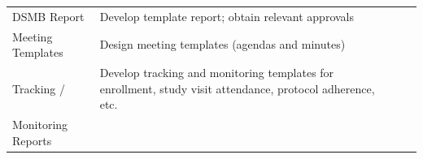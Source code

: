 \documentclass[]{book}
\begin{document}
\begin{longtable}[]{@{}llll@{}}
\begin{minipage}[t]{0.08\columnwidth}\raggedright\strut
DSMB Report\strut
\end{minipage} & \begin{minipage}[t]{0.28\columnwidth}\raggedright\strut
Develop template report; obtain relevant approvals\strut
\end{minipage} & \begin{minipage}[t]{0.35\columnwidth}\raggedright\strut
\strut
\end{minipage} & \begin{minipage}[t]{0.17\columnwidth}\raggedright\strut
\strut
\end{minipage}\tabularnewline
\begin{minipage}[t]{0.08\columnwidth}\raggedright\strut
Meeting Templates\strut
\end{minipage} & \begin{minipage}[t]{0.28\columnwidth}\raggedright\strut
Design meeting templates (agendas and minutes)\strut
\end{minipage} & \begin{minipage}[t]{0.35\columnwidth}\raggedright\strut
\strut
\end{minipage} & \begin{minipage}[t]{0.17\columnwidth}\raggedright\strut
\strut
\end{minipage}\tabularnewline
\begin{minipage}[t]{0.08\columnwidth}\raggedright\strut
Tracking /\strut
\end{minipage} & \begin{minipage}[t]{0.28\columnwidth}\raggedright\strut
Develop tracking and monitoring templates for enrollment, study visit
attendance, protocol adherence, etc.\strut
\end{minipage} & \begin{minipage}[t]{0.35\columnwidth}\raggedright\strut
\strut
\end{minipage} & \begin{minipage}[t]{0.17\columnwidth}\raggedright\strut
\strut
\end{minipage}\tabularnewline
\begin{minipage}[t]{0.08\columnwidth}\raggedright\strut
Monitoring Reports\strut
\end{minipage} & \begin{minipage}[t]{0.28\columnwidth}\raggedright\strut
\strut
\end{minipage} & \begin{minipage}[t]{0.35\columnwidth}\raggedright\strut

\end{minipage}
\end{longtable}
\end{document}
